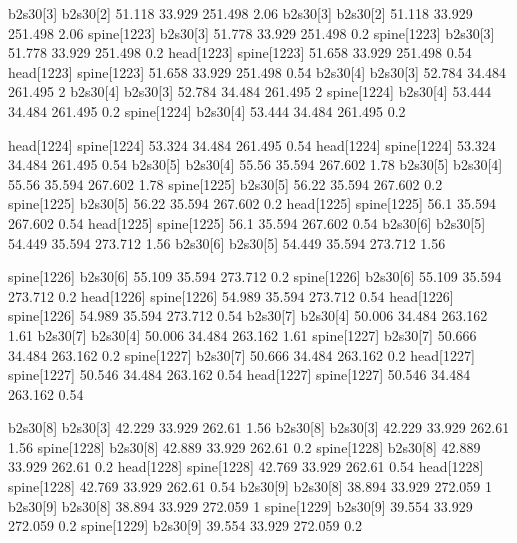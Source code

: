 b2s30[3]    b2s30[2]    51.118    33.929    251.498    2.06
b2s30[3]    b2s30[2]    51.118    33.929    251.498    2.06
spine[1223]    b2s30[3]    51.778    33.929    251.498    0.2
spine[1223]    b2s30[3]    51.778    33.929    251.498    0.2
head[1223]    spine[1223]    51.658    33.929    251.498    0.54
head[1223]    spine[1223]    51.658    33.929    251.498    0.54
b2s30[4]    b2s30[3]    52.784    34.484    261.495    2
b2s30[4]    b2s30[3]    52.784    34.484    261.495    2
spine[1224]    b2s30[4]    53.444    34.484    261.495    0.2
spine[1224]    b2s30[4]    53.444    34.484    261.495    0.2


head[1224]    spine[1224]    53.324    34.484    261.495    0.54
head[1224]    spine[1224]    53.324    34.484    261.495    0.54
b2s30[5]    b2s30[4]    55.56    35.594    267.602    1.78
b2s30[5]    b2s30[4]    55.56    35.594    267.602    1.78
spine[1225]    b2s30[5]    56.22    35.594    267.602    0.2
spine[1225]    b2s30[5]    56.22    35.594    267.602    0.2
head[1225]    spine[1225]    56.1    35.594    267.602    0.54
head[1225]    spine[1225]    56.1    35.594    267.602    0.54
b2s30[6]    b2s30[5]    54.449    35.594    273.712    1.56
b2s30[6]    b2s30[5]    54.449    35.594    273.712    1.56


spine[1226]    b2s30[6]    55.109    35.594    273.712    0.2
spine[1226]    b2s30[6]    55.109    35.594    273.712    0.2
head[1226]    spine[1226]    54.989    35.594    273.712    0.54
head[1226]    spine[1226]    54.989    35.594    273.712    0.54
b2s30[7]    b2s30[4]    50.006    34.484    263.162    1.61
b2s30[7]    b2s30[4]    50.006    34.484    263.162    1.61
spine[1227]    b2s30[7]    50.666    34.484    263.162    0.2
spine[1227]    b2s30[7]    50.666    34.484    263.162    0.2
head[1227]    spine[1227]    50.546    34.484    263.162    0.54
head[1227]    spine[1227]    50.546    34.484    263.162    0.54


b2s30[8]    b2s30[3]    42.229    33.929    262.61    1.56
b2s30[8]    b2s30[3]    42.229    33.929    262.61    1.56
spine[1228]    b2s30[8]    42.889    33.929    262.61    0.2
spine[1228]    b2s30[8]    42.889    33.929    262.61    0.2
head[1228]    spine[1228]    42.769    33.929    262.61    0.54
head[1228]    spine[1228]    42.769    33.929    262.61    0.54
b2s30[9]    b2s30[8]    38.894    33.929    272.059    1
b2s30[9]    b2s30[8]    38.894    33.929    272.059    1
spine[1229]    b2s30[9]    39.554    33.929    272.059    0.2
spine[1229]    b2s30[9]    39.554    33.929    272.059    0.2


